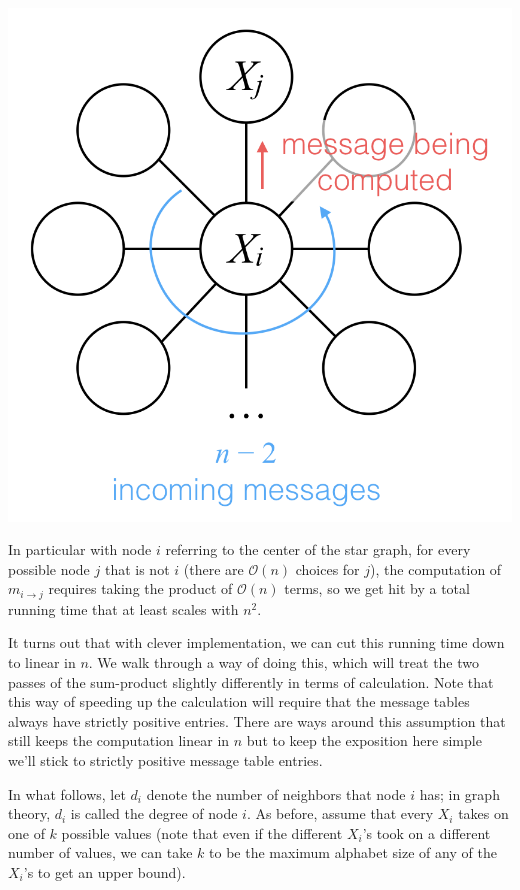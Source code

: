 \documentclass[6008notes.tex]{subfiles}
\begin{document}
{\centering\includegraphics[scale=0.4]{images_ex-sum-product-complexity-star-graph} \par}

In particular with node $i$ referring to the center of the star graph, for every possible node $j$ that is not $i$ (there are $\mathcal{O}(n)$ choices for $j$), the computation of $m_{i\rightarrow j}$ requires taking the product of $\mathcal{O}(n)$ terms, so we get hit by a total running time that at least scales with $n^2$.

It turns out that with clever implementation, we can cut this running time down to linear in $n$. We walk through a way of doing this, which will treat the two passes of the sum-product slightly differently in terms of calculation. Note that this way of speeding up the calculation will require that the message tables always have strictly positive entries. There are ways around this assumption that still keeps the computation linear in $n$ but to keep the exposition here simple we'll stick to strictly positive message table entries.

In what follows, let $d_i$ denote the number of neighbors that node $i$ has; in graph theory, $d_i$ is called the degree of node $i$. As before, assume that every $X_i$ takes on one of $k$ possible values (note that even if the different $X_i$'s took on a different number of values, we can take $k$ to be the maximum alphabet size of any of the $X_i$'s to get an upper bound).
\end{document}

